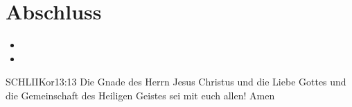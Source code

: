 \documentclass[14pt]{../../inc/mybib}
\begin{document}
\section{Abschluss}
\begin{itemize}
    \item [] 
    \item [] \beten{}
\end{itemize}
\begin{bibelbox}{SCHL}{IIKor}{13:13}
    Die Gnade des Herrn Jesus Christus und die Liebe Gottes und die Gemeinschaft des Heiligen Geistes sei mit euch allen! Amen
\end{bibelbox}
\end{document}
